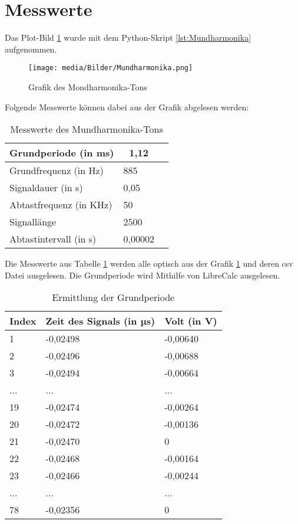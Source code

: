 \documentclass[12pt, oneside, a4paper, \docLanguage]{report}
\begin{document}
\newpage

\section{Messwerte}
\label{chap:VERSUCH_1_MESSWERTE}

Das Plot-Bild \ref{fig:Mundharmonika} wurde mit dem Python-Skript \ref{lst:Mundharmonika} aufgenommen.
\begin{figure}[h]
	\centering
	\texttt{[image: media/Bilder/Mundharmonika.png]}
	\caption[Mundharmonika]{Grafik des Mondharmonika-Tons}
	\label{fig:Mundharmonika}
\end{figure}

Folgende Messwerte können dabei aus der Grafik abgelesen werden:
\begin{table}[H]
	\centering
	\begin{tabular}{|l|l|l|}
		\hline
		\multicolumn{1}{|c|}{Grundperiode (in ms)} & \multicolumn{1}{c|}{1,12} \\ \hline
		Grundfrequenz (in Hz) & 885 \\ \hline
		Signaldauer (in s) & 0,05 \\ \hline
		Abtastfrequenz (in KHz) & 50 \\ \hline
		Signallänge & 2500 \\ \hline
		Abtastintervall (in s) & 0,00002 \\ \hline
	\end{tabular}
	\caption{Messwerte des Mundharmonika-Tons}
	\label{tab:Mundharmonika}
\end{table}

\newpage

Die Messwerte aus Tabelle \ref{tab:Mundharmonika} werden alle optisch aus der Grafik \ref{fig:Mundharmonika} und deren csv Datei ausgelesen. Die Grundperiode wird Mithilfe von LibreCalc ausgelesen.

\begin{table}[H]
	\centering
	\begin{tabular}{|l|l|l|}
		\hline
		\multicolumn{1}{|c|}{Index} &
		\multicolumn{1}{|c|}{Zeit des Signals (in µs)} &
		 \multicolumn{1}{c|}{Volt (in V)} \\ \hline
		1 & -0,02498 & -0,00640 \\ \hline
		2 & -0,02496 & -0,00688 \\ \hline
		3 & -0,02494 & -0,00664 \\ \hline
		... & ... & ... \\ \hline
		19 & -0,02474  & -0,00264 \\ \hline
		20 & -0,02472  & -0,00136 \\ \hline
		21 & -0,02470  & 0 \\ \hline
		22 & -0,02468  & -0,00164 \\ \hline
		23 & -0,02466  & -0,00244 \\ \hline
		... & ... & ... \\ \hline
		78 & -0,02356  & 0 \\ \hline
	\end{tabular}
	\caption{Ermittlung der Grundperiode}
	\label{tab:Grundperiode}
\end{table}
\end{document}
